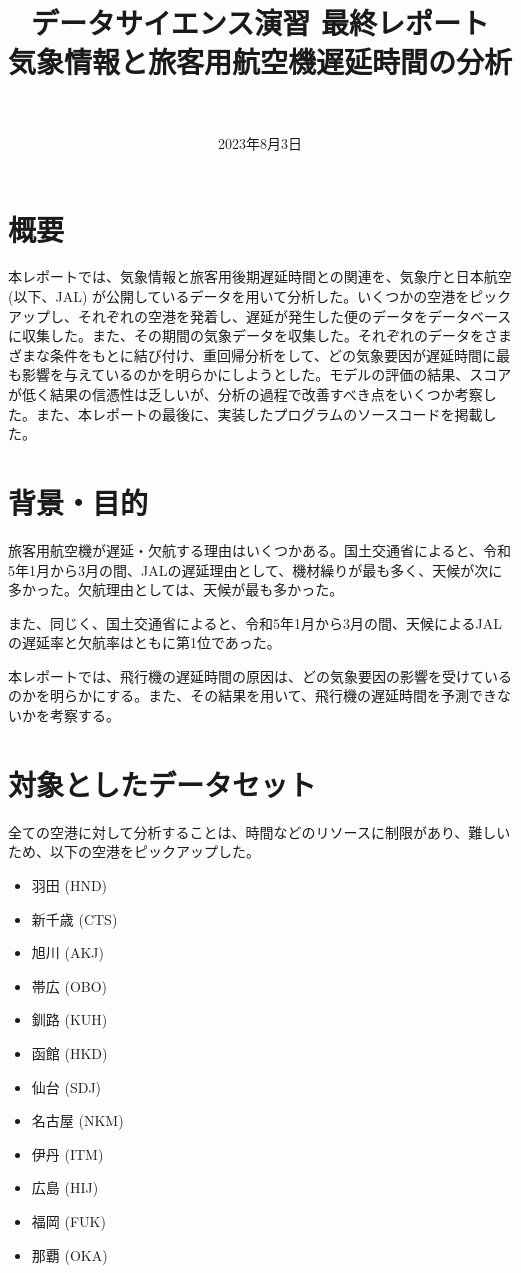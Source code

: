 \documentclass[12pt,a4paper,dvipdfmx,titlepage]{jsarticle}
\begin{document}
\title{
    データサイエンス演習 最終レポート\\
    \large 気象情報と旅客用航空機遅延時間の分析
}

\author{
	\\
}

\date{2023年8月3日}

\maketitle

\section*{概要}
本レポートでは、気象情報と旅客用後期遅延時間との関連を、気象庁と日本航空 (以下、JAL) が公開しているデータを用いて分析した。いくつかの空港をピックアップし、それぞれの空港を発着し、遅延が発生した便のデータをデータベースに収集した。また、その期間の気象データを収集した。それぞれのデータをさまざまな条件をもとに結び付け、重回帰分析をして、どの気象要因が遅延時間に最も影響を与えているのかを明らかにしようとした。モデルの評価の結果、スコアが低く結果の信憑性は乏しいが、分析の過程で改善すべき点をいくつか考察した。また、本レポートの最後に、実装したプログラムのソースコードを掲載した。

\section*{背景・目的}
旅客用航空機が遅延・欠航する理由はいくつかある。国土交通省\cite{delayAndCancellationRate}によると、令和5年1月から3月の間、JALの遅延理由として、機材繰りが最も多く、天候が次に多かった。欠航理由としては、天候が最も多かった。

また、同じく、国土交通省\cite{delayAndCancellationRate}によると、令和5年1月から3月の間、天候によるJALの遅延率と欠航率はともに第1位であった。

本レポートでは、飛行機の遅延時間の原因は、どの気象要因の影響を受けているのかを明らかにする。また、その結果を用いて、飛行機の遅延時間を予測できないかを考察する。

\section*{対象としたデータセット}
全ての空港に対して分析することは、時間などのリソースに制限があり、難しいため、以下の空港をピックアップした。
\begin{itemize}
    \item 羽田 (HND)
    \item 新千歳 (CTS)
    \item 旭川 (AKJ)
    \item 帯広 (OBO)
    \item 釧路 (KUH)
    \item 函館 (HKD)
    \item 仙台 (SDJ)
    \item 名古屋 (NKM)
    \item 伊丹 (ITM)
    \item 広島 (HIJ)
    \item 福岡 (FUK)
    \item 那覇 (OKA)
\end{itemize}
\end{document}
